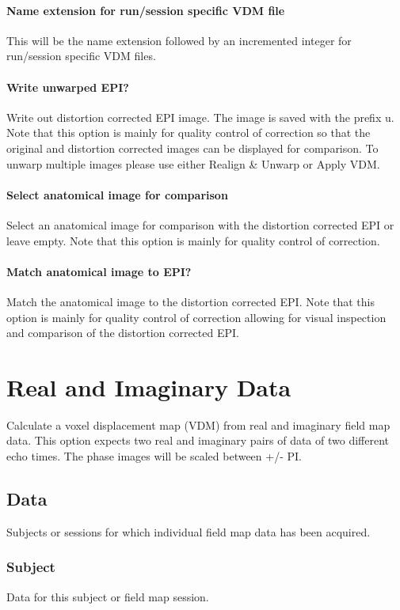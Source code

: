 \paragraph{Name extension for run/session specific VDM file}
This will be the name extension followed by an incremented integer for run/session specific VDM files.


\paragraph{Write unwarped EPI?}
Write out distortion corrected EPI image. The image is saved with the prefix u. Note that this option is mainly for quality control of correction so that the original and distortion corrected images can be displayed for comparison. To unwarp multiple images please use either Realign \& Unwarp or Apply VDM.


\paragraph{Select anatomical image for comparison}
Select an anatomical image for comparison with the distortion corrected EPI or leave empty. Note that this option is mainly for quality control of correction.


\paragraph{Match anatomical image to EPI?}
Match the anatomical image to the distortion corrected EPI. Note that this option is mainly for quality control of correction allowing for visual inspection and comparison of the distortion corrected EPI.


\section{Real and Imaginary Data}
Calculate a voxel displacement map (VDM) from real and imaginary field map data. This option expects two real and imaginary pairs of data of two different echo times. The phase images will be scaled between +/- PI.


\subsection{Data}
Subjects or sessions for which individual field map data has been acquired.


\subsubsection{Subject}
Data for this subject or field map session.


